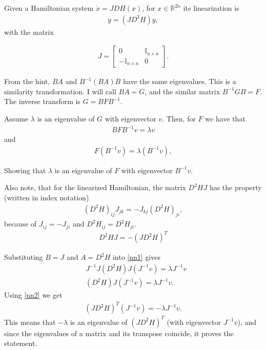 \begin{solution}[8.5]
Given a Hamiltonian system $\dot{x} = JDH(x)$, for $x\in \mathbb{R}^{2n}$ its linearization is 
\begin{align}
\dot{y} = (JD^2H)y,
\end{align}
with the matrix 

\begin{align}
J = \begin{bmatrix}
    0 & \mathbb{I}_{n\times n} \\
    -\mathbb{I}_{n\times n} &  0
\end{bmatrix}.
\end{align}

From the hint, $BA$ and $B^{-1}(BA)B$ have the same eigenvalues. This is a similarity transformation. I will call $BA=G$, and the similar matrix $B^{-1}GB=F$. The inverse transform is $G=BFB^{-1}$. 

Assume $\lambda$ is an eigenvalue of $G$ with eigenvector $v$. Then, for $F$ we have that
\begin{align}
BFB^{-1}v = \lambda v
\end{align}
and 
\begin{align}
    F(B^{-1}v) = \lambda (B^{-1}v), \label{nn1}
\end{align}


Showing that $\lambda$ is an eigenvalue of $F$ with eigenvector $B^{-1}v$.

Also note, that for the linearized Hamiltonian, the matrix $D^2HJ$ has the property (written in index notation) 
\begin{align}
(D^2H)_{ij}J_{jk} = - J_{kj}(D^2H)_{ji}, 
\end{align}
because of $J_{ij} = - J_{ji}$ and $D^2H_{ij} = D^2H_{ji}$. 
\begin{align}
     D^2HJ = - (JD^2H)^T \label{nn2}
\end{align}

Substituting $B=J$ and $A=D^2H$ into \eqref{nn1} gives
\begin{align}
    &J^{-1}J(D^2H)J(J^{-1}v) = \lambda J^{-1}v \\
    &(D^2H) J (J^{-1}v) = \lambda J^{-1}v.
\end{align}
Using \eqref{nn2} we get
\begin{align}
(JD^2H)^T(J^{-1}v) = -\lambda J^{-1}v.
\end{align}
This means that $-\lambda$ is an eigenvalue of $(JD^2H)^T$ (with eigenvector $J^{-1}v$), and since the eigenvalues of a matrix and its transpose coincide, it proves the statement. 


\end{solution}
